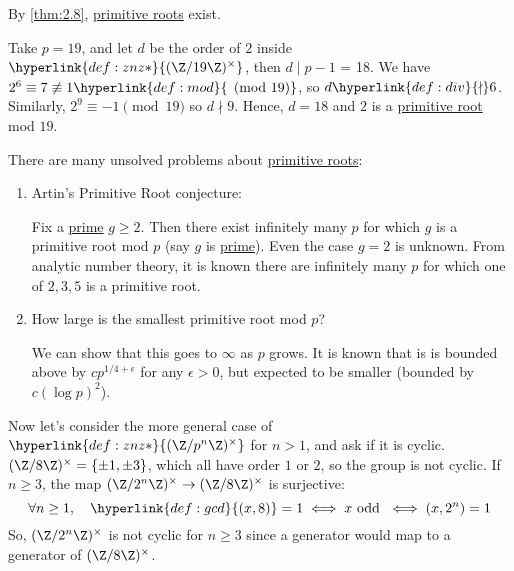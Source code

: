 \documentclass{article}
\begin{document}


By \cref{thm:2.8}, \hyperlink{def:primRoot}{primitive roots} exist.

\begin{eg}
    Take $p = 19$, and let $d$ be the order of $2$ inside $\hyperlink{def:znz*}{(\Z/19\Z)^\times}$, then $d \mid p-1$ = 18.
    We have $2^6 \equiv 7 \not\equiv 1 \hyperlink{def:mod}{\pmod{19}}$, so $d \hyperlink{def:div}{\nmid} 6$.
    Similarly, $2^9 \equiv -1 \pmod{19}$ so $d \nmid 9$.  Hence, $d=18$ and $2$ is a \hyperlink{def:primRoot}{primitive root} mod $19$.
\end{eg}

There are many unsolved problems about \hyperlink{def:primRoot}{primitive roots}:
\begin{enumerate}
    \item Artin's Primitive Root conjecture:

        Fix a \hyperlink{def:prime}{prime} $g \geq 2$. Then there exist infinitely many $p$ for which $g$ is a primitive root mod $p$ (say $g$ is \hyperlink{def:prime}{prime}).
        Even the case $g=2$ is unknown.
        From analytic number theory, it is known there are infinitely many $p$ for which one of $2, 3, 5$ is a primitive root.
    \item How large is the smallest primitive root mod $p$?

        We can show that this goes to $\infty$ as $p$ grows.
        It is known that is is bounded above by $c p^{1/4 + \epsilon}$ for any $\epsilon > 0$, but expected to be smaller (bounded by $c (\log p)^2$).
\end{enumerate}

Now let's consider the more general case of $\hyperlink{def:znz*}{(\Z / p^n \Z)^\times}$ for $n > 1$, and ask if it is cyclic.
$(\Z / 8 \Z)^\times = \{\pm 1, \pm 3\}$, which all have order $1$ or $2$, so the group is not cyclic.
If $n \geq 3$, the map $(\Z/2^n \Z)^\times \to (\Z/8 \Z)^\times$ is surjective:
\begin{equation*}\forall n \geq 1, \quad \hyperlink{def:gcd}{(x, 8)} = 1 \iff x \text{ odd } \iff (x, 2^n) = 1 \end{equation*}
So, $(\Z/2^n \Z)^\times$ is not cyclic for $n \geq 3$ since a generator would map to a generator of $(\Z / 8 \Z)^\times$.
\end{document}
